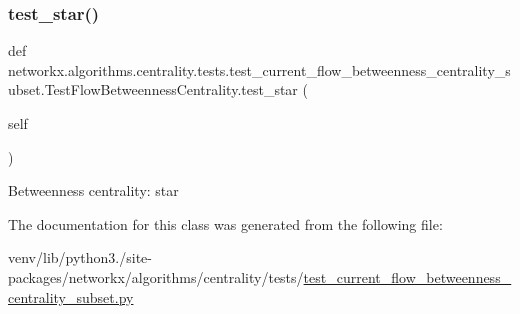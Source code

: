 \subsubsection{\texorpdfstring{test\+\_\+star()}{test\_star()}}
{\footnotesize\ttfamily def networkx.\+algorithms.\+centrality.\+tests.\+test\+\_\+current\+\_\+flow\+\_\+betweenness\+\_\+centrality\+\_\+subset.\+Test\+Flow\+Betweenness\+Centrality.\+test\+\_\+star (\begin{DoxyParamCaption}\item[{}]{self }\end{DoxyParamCaption})}

\begin{DoxyVerb}Betweenness centrality: star\end{DoxyVerb}
 

The documentation for this class was generated from the following file\+:\begin{DoxyCompactItemize}
\item 
venv/lib/python3./site-\/packages/networkx/algorithms/centrality/tests/\hyperlink{test__current__flow__betweenness__centrality__subset_8py}{test\+\_\+current\+\_\+flow\+\_\+betweenness\+\_\+centrality\+\_\+subset.\+py}\end{DoxyCompactItemize}
